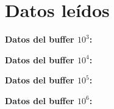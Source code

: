 \documentclass[12pt,journal,compsoc]{IEEEtran}
\begin{document}
\section{Datos leídos}
\label{appendixC}

\textbf{Datos del buffer $10^{3}$:}


\noindent \textbf{Datos del buffer $10^{4}$:}


\noindent \textbf{Datos del buffer $10^{5}$:}


\noindent \textbf{Datos del buffer $10^{6}$:}


\ifCLASSOPTIONcaptionsoff
  \newpage
\fi
\end{document}
